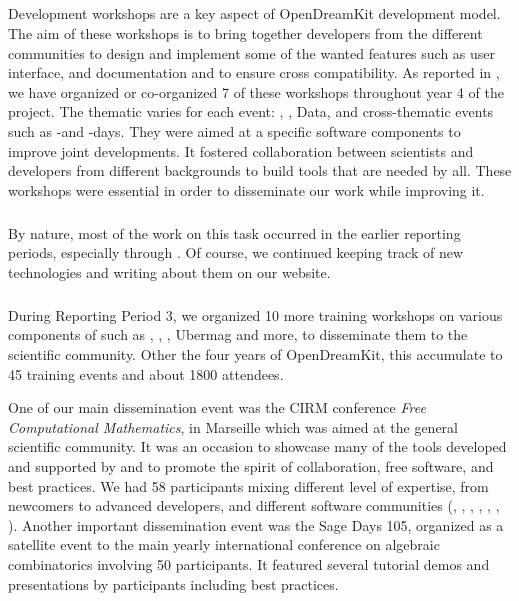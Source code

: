 \subparagraph{}
\label{dissem@devel-workshops}

Development workshops are a key aspect of OpenDreamKit development model. The aim of these workshops is to bring together developers from the different communities to design and implement some
of the wanted features such as user interface, and documentation and to ensure cross compatibility.
As reported in , we have organized
or co-organized 7  of these workshops throughout year 4 of the project. The thematic varies
for each event: \PariGP, \Linbox, Data, and cross-thematic events such as \GAP-\Sage and \GAP-\Singular days. They were aimed at a specific software components to improve joint developments. It fostered collaboration between scientists and developers from different backgrounds to build tools that are needed by all. These workshops were essential in order to disseminate our work while improving it.

\subparagraph{}

By nature, most of the work on this task occurred in the earlier
reporting periods, especially through .
Of course, we continued keeping track of new technologies and writing
about them on our website.

\subparagraph{}
\label{dissem@dissemination}

During Reporting Period 3, we organized 10 more training workshops on
various components of \ODK such as \Sage, \Jupyter, \GAP, Ubermag and
more, to disseminate them to the scientific community. Other the four
years of OpenDreamKit, this accumulate to 45 training events and about
1800 attendees.


One of our main dissemination event was the CIRM conference \emph{Free Computational Mathematics}, in Marseille which was aimed at the general scientific community.  It was an occasion to showcase  many of the tools developed and supported by \ODK and to promote the spirit of collaboration, free software, and best practices. We had 58 participants mixing different level of expertise, from newcomers to advanced developers, and different software communities (\GAP, \Jupyter, \Linbox,  \MPIR, \PariGP, \Sage, \Singular). Another important dissemination event was the Sage Days 105, organized as a satellite event to the main yearly international conference  on algebraic combinatorics involving 50 participants. It featured several tutorial demos and presentations by \ODK participants including best practices.

